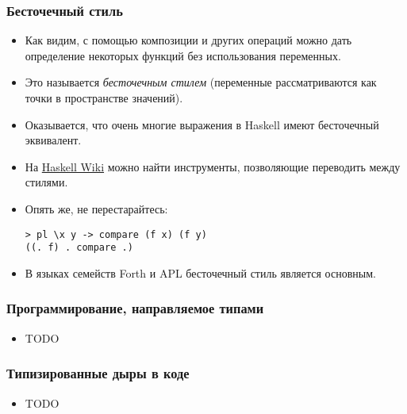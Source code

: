 \documentclass[10pt]{beamer}
\begin{document}
\begin{frame}[fragile]
\frametitle{Бесточечный стиль}
\begin{itemize}
    \item Как видим, с помощью композиции и других операций можно дать определение некоторых функций без использования переменных.
    \item Это называется \emph{бесточечным стилем} (переменные рассматриваются как точки в пространстве значений).\pause
    \item Оказывается, что очень многие выражения в Haskell имеют бесточечный эквивалент.
    \item На \href{https://wiki.haskell.org/Pointfree}{Haskell Wiki} можно найти инструменты, позволяющие переводить между стилями.
    \item Опять же, не перестарайтесь:
\begin{lstlisting}
> pl \x y -> compare (f x) (f y)
((. f) . compare .)
\end{lstlisting}\pause
    \item В языках семейств Forth и APL бесточечный стиль является основным.
\end{itemize}
\end{frame}

\begin{frame}[fragile]
\frametitle{Программирование, направляемое типами}
\begin{itemize}
    \item TODO
\end{itemize}
\end{frame}

\begin{frame}[fragile]
\frametitle{Типизированные дыры в коде}
\begin{itemize}
    \item TODO
\end{itemize}
\end{frame}

\end{document}
